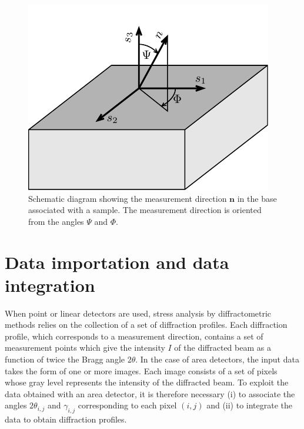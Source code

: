\documentclass[french,a4paper]{report}
\begin{document}
\begin{figure}
\centering
\includegraphics{figures/echantillon.pdf}
\caption{Schematic diagram showing the measurement direction $\boldsymbol n$ in the base associated with a sample. The measurement direction is oriented from the angles $\Psi$ and $\Phi$.}
\label{fig_echantillon}
\end{figure}

\section{Data importation and data integration}

When point or linear detectors are used, stress analysis by diffractometric methods relies on the collection of a set of diffraction profiles. Each diffraction profile, which corresponds to a measurement direction, contains a set of measurement points which give the intensity $I$ of the diffracted beam as a function of twice the Bragg angle $2 \theta$. In the case of area detectors, the input data takes the form of one or more images. Each image consists of a set of pixels whose gray level represents the intensity of the diffracted beam. To exploit the data obtained with an area detector, it is therefore necessary (i) to associate the angles $2 \theta_{i,j}$ and $\gamma_{i,j} $ corresponding to each pixel $(i,j)$ and (ii) to integrate the data to obtain diffraction profiles.
\end{document}
